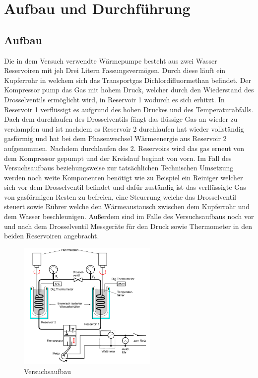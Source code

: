 \section{Aufbau und Durchführung}
\subsection{Aufbau}

Die in dem Versuch verwendte Wärmepumpe besteht aus zwei Wasser Reservoiren mit jeh Drei Litern Fassungsvermögen.
Durch diese läuft ein Kupferrohr in welchem sich das Transportgas Dichlordifluormethan befindet.
Der Kompressor pump das Gas mit hohem Druck, welcher durch den Wiederstand des Drosselventils ermöglicht wird, in Reservoir 1 wodurch es sich erhitzt.
In Reservoir 1 verflüssigt es aufgrund des hohen Druckes und des Temperaturabfalls.
Dach dem durchlaufen des Drosselventils fängt das flüssige Gas an wieder zu verdampfen und ist nachdem es Reservoir 2 durchlaufen hat wieder vollständig gasförmig und hat bei dem Phasenwechsel Wärmeenergie aus Reservoir 2 aufgenommen.
Nachdem durchlaufen des 2. Reservoirs wird das gas erneut von dem Kompressor gepumpt und der Kreislauf beginnt von vorn.
Im Fall des Versuchsaufbaus beziehungsweise zur tatsächlichen Technischen Umsetzung werden noch weite Komponenten benötigt wie zu Beispiel ein Reiniger welcher sich vor dem Drosselventil befindet und dafür zuständig ist das verflüssigte Gas von gasförmigen Resten zu befreien,
eine Steuerung welche das Drosselventil steuert sowie Rührer welche den Wärmeaustausch zwischen dem Kupferrohr und dem Wasser beschleunigen.
Außerdem sind im Falle des Versuchsaufbaus noch vor und nach dem Drosselventil Messgeräte für den Druck sowie Thermometer in den beiden Reservoiren angebracht.
\begin{figure}[H]
  \centering
  \includegraphics[width=0.6\textwidth]{assets/aufbau.png}
  \caption{Versuchsaufbau}
  \label{fig:aufbau}
\end{figure}
